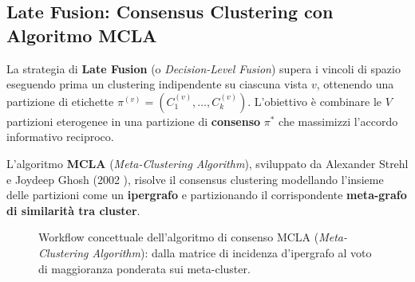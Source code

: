 \FloatBarrier
\subsection{Late Fusion: Consensus Clustering con Algoritmo MCLA}
\label{subsec:lab-late-fusion-mcla}

La strategia di \textbf{Late Fusion} (o \textit{Decision-Level Fusion}) supera i vincoli di spazio eseguendo prima un clustering indipendente su ciascuna vista $v$, ottenendo una partizione di etichette $\pi^{(v)} = (C_1^{(v)}, \dots, C_k^{(v)})$. L'obiettivo è combinare le $V$ partizioni eterogenee in una partizione di \textbf{consenso} $\pi^*$ che massimizzi l'accordo informativo reciproco.

L'algoritmo \textbf{MCLA} (\textit{Meta-Clustering Algorithm}), sviluppato da Alexander Strehl e Joydeep Ghosh (2002 \cite{strehl2002}), risolve il consensus clustering modellando l'insieme delle partizioni come un \textbf{ipergrafo} e partizionando il corrispondente \textbf{meta-grafo di similarità tra cluster}.

\FloatBarrier
\begin{figure}[H]
\centering
{}
\caption{Workflow concettuale dell'algoritmo di consenso MCLA (\textit{Meta-Clustering Algorithm}): dalla matrice di incidenza d'ipergrafo al voto di maggioranza ponderata sui meta-cluster.}
\label{fig:mcla-workflow}
\end{figure}

